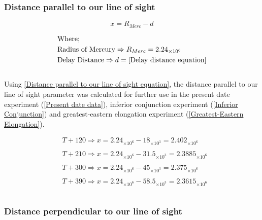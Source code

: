 \documentclass[11pt]{article}
\begin{document}
\begin{multicols}{2}
\subsubsection{Distance parallel to our line of sight}

\begin{equation} \label{Distance parallel to our line of sight equation}
{x = R_{Merc} - d}
\end{equation}

\begin{equation*}
\begin{split}
&\text{Where;} \\
&\text{Radius of Mercury} \Rightarrow {R_{Merc}}=2.24_{\times10^6} \\
&\text{Delay Distance} \Rightarrow d = \cref{Delay distance equation} \\
\end{split}
\end{equation*}\\

Using \cref{Distance parallel to our line of sight equation}, the distance parallel to our line of sight parameter was calculated for further use in the present date experiment (\cref{Present date data}), inferior conjunction experiment (\cref{Inferior Conjunction}) and greatest-eastern elongation experiment (\cref{Greatest-Eastern Elongation}). 

\begin{equation} \label{Distance parallel to our line of sight parameter}
\begin{split}
&T + 120 \Rightarrow {x= 2.24_{\times10^6}-18_{\times10^3}=2.402_{\times10^6}} \\
\\
&T + 210 \Rightarrow {x= 2.24_{\times10^6}-31.5_{\times10^3}=2.3885_{\times10^6}} \\
\\
&T + 300 \Rightarrow {x= 2.24_{\times10^6}-45_{\times10^3}=2.375_{\times10^6}} \\
\\
&T + 390 \Rightarrow {x= 2.24_{\times10^6}-58.5_{\times10^3}=2.3615_{\times10^6}} \\
\\
\end{split}
\end{equation}


\subsubsection{Distance perpendicular to our line of sight}


\end{multicols}
\end{document}
